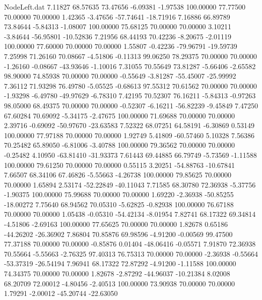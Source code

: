 \begin{filecontents}{NodeLeft.dat}
   7.11827   68.57635   73.47656    -6.09381   -1.97538  100.00000   77.77500   70.00000   70.00000    1.42365   -3.47656  -57.74641  -18.71916
   7.16886   66.89789   73.84644    -5.84313   -1.08007  100.00000   75.68125   70.00000   70.00000    3.10211   -3.84644  -56.95801  -10.52836
   7.21956   68.44193   70.42236    -8.20675   -2.01119  100.00000   77.60000   70.00000   70.00000    1.55807   -0.42236  -79.96791  -19.59739
   7.25998   71.26160   70.08667    -4.51806   -0.11313   99.06250   78.29375   70.00000   70.00000   -1.26160   -0.08667  -43.93646   -1.10016
   7.31055   70.55649   73.81287    -5.66406   -2.65582   98.90000   74.85938   70.00000   70.00000   -0.55649   -3.81287  -55.45007  -25.99992
   7.36112   71.93298   76.49780    -5.05525   -0.68613   97.55312   70.61562   70.00000   70.00000   -1.93298   -6.49780  -49.97629   -6.78310
   7.42195   70.52307   76.16211    -5.84313   -0.97263   98.05000   68.49375   70.00000   70.00000   -0.52307   -6.16211  -56.82239   -9.45849
   7.47250   67.60284   70.69092    -5.34175   -2.47675  100.00000   71.69688   70.00000   70.00000    2.39716   -0.69092  -50.97670  -23.63583
   7.52322   68.07251   64.58191    -6.30869    0.53149  100.00000   77.97188   70.00000   70.00000    1.92749    5.41809  -60.57460    5.10328
   7.56386   70.25482   65.89050    -6.81006   -3.40788  100.00000   79.36562   70.00000   70.00000   -0.25482    4.10950  -63.81410  -31.93373
   7.61443   69.44885   66.79749    -5.73569   -1.11588  100.00000   79.61250   70.00000   70.00000    0.55115    3.20251  -54.88763  -10.67841
   7.66507   68.34106   67.46826    -5.55663   -4.26738  100.00000   79.85625   70.00000   70.00000    1.65894    2.53174  -52.22849  -40.11043
   7.71585   68.30780   72.36938    -5.37756   -1.90375  100.00000   75.99688   70.00000   70.00000    1.69220   -2.36938  -50.85255  -18.00272
   7.75640   68.94562   70.05310    -5.62825   -0.82938  100.00000   76.67188   70.00000   70.00000    1.05438   -0.05310  -54.42134   -8.01954
   7.82741   68.17322   69.34814    -4.51806   -2.69163  100.00000   77.65625   70.00000   70.00000    1.82678    0.65186  -44.26202  -26.36902
   7.86804   70.85876   69.98596    -4.91200   -0.00569   99.47500   77.37188   70.00000   70.00000   -0.85876    0.01404  -48.06416   -0.05571
   7.91870   72.36938   70.55664    -5.55663   -2.76325   97.40313   76.75313   70.00000   70.00000   -2.36938   -0.55664  -53.37319  -26.54194
   7.96941   68.17322   72.87292    -4.91200   -1.11588  100.00000   74.34375   70.00000   70.00000    1.82678   -2.87292  -44.96037  -10.21384
   8.02008   68.20709   72.00012    -4.80456   -2.40513  100.00000   73.90938   70.00000   70.00000    1.79291   -2.00012  -45.20744  -22.63050

\end{filecontents}
